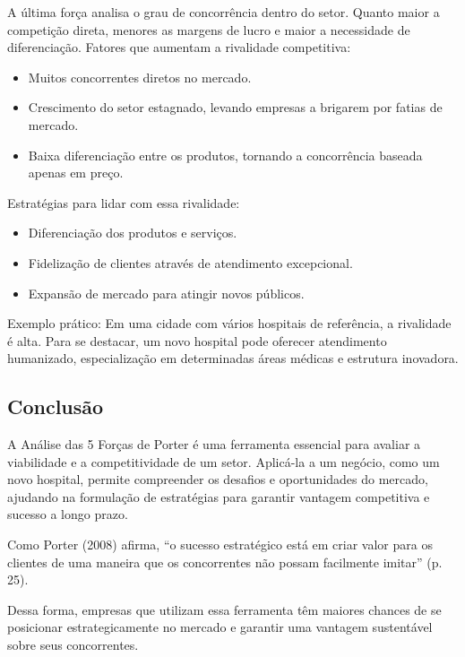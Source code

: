 \documentclass[11pt]{article}
\begin{document}
A última força analisa o grau de concorrência dentro do setor. Quanto maior a competição direta, menores as margens de lucro e maior a necessidade de diferenciação.
Fatores que aumentam a rivalidade competitiva:

\begin{itemize}
\item Muitos concorrentes diretos no mercado.
\item Crescimento do setor estagnado, levando empresas a brigarem por fatias de mercado.
\item Baixa diferenciação entre os produtos, tornando a concorrência baseada apenas em preço.
\end{itemize}

Estratégias para lidar com essa rivalidade:

\begin{itemize}
\item Diferenciação dos produtos e serviços.
\item Fidelização de clientes através de atendimento excepcional.
\item Expansão de mercado para atingir novos públicos.
\end{itemize}

\begingroup
\leftskip=4cm
\parindent=0pt
Exemplo prático: Em uma cidade com vários hospitais de referência, a rivalidade é alta. Para se destacar, um novo hospital pode oferecer atendimento humanizado, especialização em determinadas áreas médicas e estrutura inovadora.
\par
\endgroup
\subsection{Conclusão}
\label{sec:orgc352003}

A Análise das 5 Forças de Porter é uma ferramenta essencial para avaliar a viabilidade e a competitividade de um setor. Aplicá-la a um negócio, como um novo hospital, permite compreender os desafios e oportunidades do mercado, ajudando na formulação de estratégias para garantir vantagem competitiva e sucesso a longo prazo.

Como Porter (2008) afirma, “o sucesso estratégico está em criar valor para os clientes de uma maneira que os concorrentes não possam facilmente imitar” (p. 25).

Dessa forma, empresas que utilizam essa ferramenta têm maiores chances de se posicionar estrategicamente no mercado e garantir uma vantagem sustentável sobre seus concorrentes. 
\end{document}
